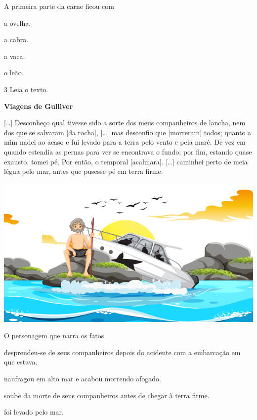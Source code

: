 A primeira parte da carne ficou com

\begin{escolha}
\begin{multicols}
\item a ovelha.

\item a cabra.

\item a vaca.

\item o leão.
\end{multicols}
\end{escolha}

\num{3} Leia o texto.

\begin{myquote}
\textbf{Viagens de Gulliver}

{[}\ldots{}{]} Desconheço qual tivesse sido a sorte dos meus
companheiros de lancha, nem dos que se salvaram [da rocha],
{[}\ldots{}{]} mas desconfio que [morreram] todos; quanto a mim nadei ao
acaso e fui levado para a terra pelo vento e pela maré. De vez em quando
estendia as pernas para ver se encontrava o fundo; por fim, estando
quase exausto, tomei pé. Por então, o temporal [acalmara]. {[}\ldots{}{]}
caminhei perto de meia légua pelo mar, antes que pusesse pé em terra
firme.

\begin{center}
\includegraphics[width=.7\textwidth]{./media/image23f.png}
\end{center}

\end{myquote}

O personagem que narra os fatos

\begin{escolha}
\item desprendeu-se de seus companheiros depois do acidente com a embarcação em que estava.

\item naufragou em alto mar e acabou morrendo afogado.

\item soube da morte de seus companheiros antes de chegar à terra firme.

\item foi levado pelo mar.
\end{escolha}


